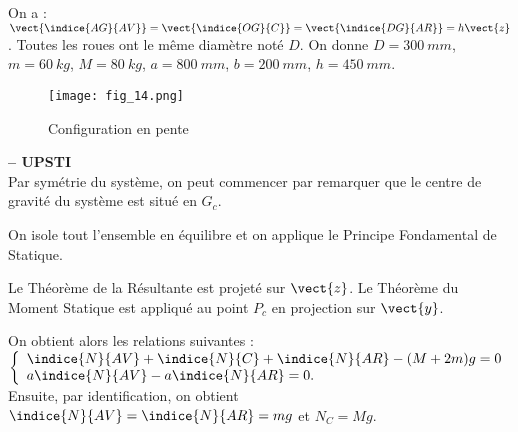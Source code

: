 On a : $\vect{\indice{AG}{AV}}=\vect{\indice{OG}{C}}=\vect{\indice{DG}{AR}}=h\vect{z}$. 
Toutes les roues ont le même diamètre noté $D$.
On donne $D =\SI{300}{mm}$, $m =\SI{60}{kg}$, $M =\SI{80}{kg}$, $a =\SI{800}{mm}$, $b =\SI{200}{mm}$, $h =\SI{450}{mm}$.


\begin{figure}[H]
\centering
\texttt{[image: fig\_14.png]}
\caption{Configuration en pente \label{fig_14}}
\end{figure}

\fi

\ifprof
\begin{corrige}\textbf{ -- UPSTI}\\ 
Par symétrie du système, on peut commencer par remarquer que le centre de gravité du système est situé en $G_c$.

On isole tout l’ensemble en équilibre et on applique le Principe Fondamental de Statique. 

Le Théorème de la Résultante est projeté sur $\vect{z}$. Le Théorème du Moment Statique est appliqué au point $P_c$ en projection sur $\vect{y}$.

On obtient alors les relations suivantes :
$\left\{
\begin{array}{l}
\indice{N}{AV} +\indice{N}{C}+\indice{N}{AR}-(M+2m)g=0 \\
a\indice{N}{AV} - a\indice{N}{AR} = 0 . \\
\end{array}
\right.$
Ensuite, par identification, on obtient $\indice{N}{AV}=\indice{N}{AR}=mg$ et $N_C = Mg$.

\end{corrige}
\else
\fi

